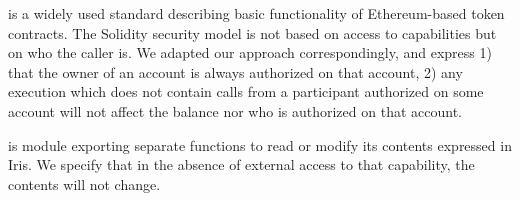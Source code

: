   is a widely used %
 standard describing  basic functionality of Ethereum-based token 
contracts. 
The Solidity security model is not based on access to  capabilities but on who the caller  is. 
We  adapted our approach correspondingly, and 
express 1) that  the owner of an account is always authorized on that account,  2) any execution which does not contain calls from a participant  authorized on some account will not affect the balance nor  who is authorized on  that account. 

 is module exporting separate functions to read or modify its contents  expressed in Iris\cite{irisWasm23}. We specify that in the absence of external access to that capability, the contents will not change. 